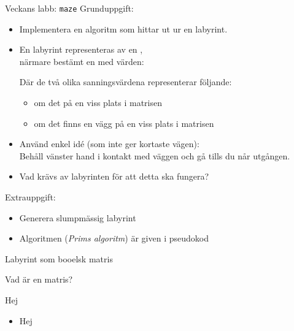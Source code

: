 

\ifkompendium\else

\begin{Slide}{Veckans labb: \texttt{maze}}\SlideFontSmall
Grunduppgift:
\begin{itemize}
\item Implementera en algoritm som hittar ut ur en labyrint.

\item En labyrint representeras av en , \\närmare bestämt en  med   värden: \\  

\pause Där de två olika sanningsvärdena representerar följande:
\begin{itemize}\SlideFontSmall
\item {} om det  på en viss plats i matrisen
\item {} om det  finns en vägg på en viss plats i matrisen 

\end{itemize}
\pause
\item Använd enkel idé (som inte ger kortaste vägen): \\ Behåll vänster hand i kontakt med väggen och gå tills du når utgången.

\item Vad krävs av labyrinten för att detta ska fungera?  
\end{itemize}
\pause Extrauppgift:
\begin{itemize}
\item Generera slumpmässig labyrint 
\item Algoritmen (\emph{Prims algoritm}) är given i pseudokod
\end{itemize}

\end{Slide}

\begin{Slide}{Labyrint som booelsk matris}
\end{Slide}


\begin{Slide}{Vad är en matris?}
\begin{multicols}{2}
Hej
\columnbreak

\begin{itemize}
\pause
\item Hej

\end{itemize}
\end{multicols}
\end{Slide}


\fi











